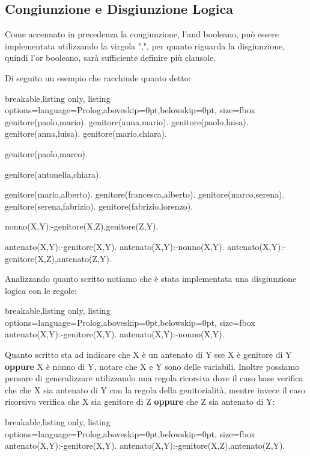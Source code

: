 \subsection{Congiunzione e Disgiunzione Logica}
Come accennato in precedenza la congiunzione, l'and booleano, può essere implementata utilizzando la virgola ",", per quanto riguarda la disgiunzione, quindi l'or booleano, sarà sufficiente definire più clausole.

Di seguito un esempio che racchiude quanto detto:
\begin{tcblisting}{breakable,listing only, listing options={language=Prolog,aboveskip=0pt,belowskip=0pt}, size=fbox}
genitore(paolo,mario).
genitore(anna,mario).
genitore(paolo,luisa).
genitore(anna,luisa).
genitore(mario,chiara). 

genitore(paolo,marco).
                       
genitore(antonella,chiara).

genitore(mario,alberto).
genitore(francesca,alberto).
genitore(marco,serena).
genitore(serena,fabrizio).
genitore(fabrizio,lorenzo).

nonno(X,Y):-genitore(X,Z),genitore(Z,Y).

antenato(X,Y):-genitore(X,Y).
antenato(X,Y):-nonno(X,Y).
antenato(X,Y):-genitore(X,Z),antenato(Z,Y).
\end{tcblisting}

Analizzando quanto scritto notiamo che è stata implementata una disgiunzione logica con le regole:
\begin{tcblisting}{breakable,listing only, listing options={language=Prolog,aboveskip=0pt,belowskip=0pt}, size=fbox}
antenato(X,Y):-genitore(X,Y).
antenato(X,Y):-nonno(X,Y).
\end{tcblisting}
Quanto scritto sta ad indicare che X è un antenato di Y sse X è genitore di Y \textbf{oppure} X è nonno di Y, notare che X e Y sono delle variabili.
\newline
Inoltre possiamo pensare di generalizzare utilizzando una regola ricorsiva dove il caso base verifica che che X sia antenato di Y con la regola della genitorialità, mentre invece il caso ricorsivo verifica che X sia genitore di Z \textbf{oppure} che Z sia antenato di Y:
\begin{tcblisting}{breakable,listing only, listing options={language=Prolog,aboveskip=0pt,belowskip=0pt}, size=fbox}
antenato(X,Y):-genitore(X,Y).
antenato(X,Y):-genitore(X,Z),antenato(Z,Y).
\end{tcblisting}

